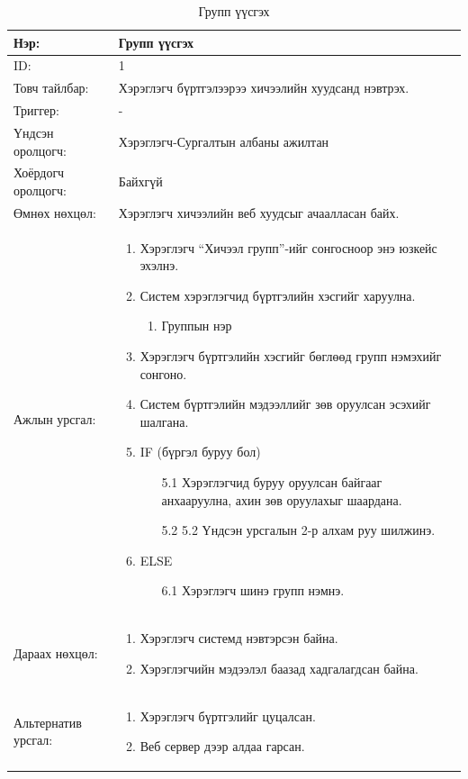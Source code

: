 \begin{center}
	\begin{table}[!htbp]
		\label{Групп үүсгэх}
		\begin{tabular}{|p{2cm}|p{13cm}|}
			\hline
			Нэр: & Групп үүсгэх \\
			\hline
			ID: & 1 \\
			\hline
			Товч тайлбар: & Хэрэглэгч бүртгэлээрээ хичээлийн  хуудсанд нэвтрэх. \\
			\hline
			Триггер: & - \\
			\hline
			Үндсэн оролцогч: & Хэрэглэгч-Сургалтын албаны ажилтан \\
			\hline
			Хоёрдогч оролцогч: & Байхгүй  \\
			\hline
			Өмнөх нөхцөл: &  Хэрэглэгч хичээлийн веб хуудсыг ачаалласан байх.\\
			\hline
			Ажлын урсгал: & \begin{enumerate}
				\item Хэрэглэгч “Хичээл групп”-ийг сонгосноор энэ юзкейс эхэлнэ. 
				\item Систем хэрэглэгчид бүртгэлийн хэсгийг харуулна. 
				\begin{enumerate}
					\item Группын нэр

				\end{enumerate}
				\item Хэрэглэгч бүртгэлийн хэсгийг бөглөөд групп нэмэхийг сонгоно. 
				\item Систем бүртгэлийн мэдээллийг зөв оруулсан эсэхийг шалгана.
				\item IF (бүргэл буруу бол)
				\begin{enumerate}
					\item[5.1]	Хэрэглэгчид буруу оруулсан байгааг анхааруулна, ахин зөв оруулахыг шаардана.
					\item[5.2] 5.2	Үндсэн урсгалын 2-р алхам руу шилжинэ. 
				\end{enumerate}
				\item ELSE
				\begin{enumerate}
					\item[6.1] Хэрэглэгч шинэ групп нэмнэ.
				\end{enumerate}
			\end{enumerate}
			\\					  \hline
			Дараах нөхцөл: &
			\begin{enumerate}
				\item Хэрэглэгч системд нэвтэрсэн байна. 
				\item Хэрэглэгчийн мэдээлэл баазад хадгалагдсан байна. 
			\end{enumerate}	   
			\\				   \hline
			Альтернатив урсгал: &  \begin{enumerate}
				\item Хэрэглэгч бүртгэлийг цуцалсан.
				\item Веб сервер дээр алдаа гарсан. 
			\end{enumerate}
			\\	\hline
		\end{tabular}
		\caption{Групп үүсгэх}
	\end{table}
\end{center}
